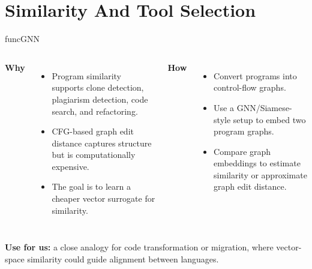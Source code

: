 \documentclass[10pt]{beamer}
\begin{document}
\section{Similarity And Tool Selection}

\begin{frame}{funcGNN}
  \begin{columns}[T,onlytextwidth]
    \textbf{Why}
    \begin{itemize}
      \item Program similarity supports clone detection, plagiarism detection, code search, and refactoring.
      \item CFG-based graph edit distance captures structure but is computationally expensive.
      \item The goal is to learn a cheaper vector surrogate for similarity.
    \end{itemize}

    \textbf{How}
    \begin{itemize}
      \item Convert programs into control-flow graphs.
      \item Use a GNN/Siamese-style setup to embed two program graphs.
      \item Compare graph embeddings to estimate similarity or approximate graph edit distance.
    \end{itemize}
  \end{columns}

  \vspace{0.25cm}
  \textbf{Use for us:} a close analogy for code transformation or migration, where vector-space similarity could guide alignment between languages.
\end{frame}
\end{document}
